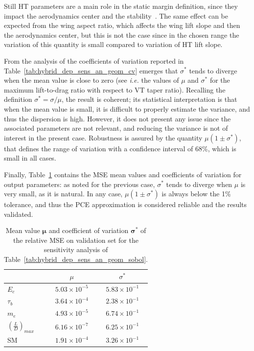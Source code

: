 Still HT parameters are a main role in the static margin definition, since they impact the aerodynamics center and the stability~\cite{bib:anderson_perfo}. 
The same effect can be expected from the wing aspect ratio, which affects the wing lift slope and then the aerodynamics center, but this is not the case since in the chosen range the variation of this quantity is small compared to variation of HT lift slope.

From the analysis of the coefficients of variation reported in Table~\ref{tab:hybrid_dep_sens_an_geom_cv} emerges that $\sigma^*$ tends to diverge when the mean value is close to zero (see \textit{i.e.} the values of $\mu$ and $\sigma^*$ for the maximum lift-to-drag ratio with respect to VT taper ratio).
Recalling the definition $\sigma^*=\sigma/\mu$, the result is coherent; its statistical interpretation is that when the mean value is small, it is difficult to properly estimate the variance, and thus the dispersion is high.
However, it does not present any issue since the associated parameters are not relevant, and reducing the variance is not of interest in the present case.
Robustness is assured by the quantity $\mu\left(1\pm\sigma^*\right)$, that defines the range of variation with a confidence interval of 68\%, which is small in all cases.

Finally, Table~\ref{tab:hybrid_dep_sensitivity_analysis_mse} contains the MSE mean values and coefficients of variation for output parameters: as noted for the previous case, $\sigma^*$ tends to diverge when $\mu$ is very small, as it is natural.
In any case, $\mu\left(1\pm\sigma^*\right)$ is always below the 1\% tolerance, and thus the PCE approximation is considered reliable and the results validated.
\begin{table}[!h]
	\centering
	\begin{tabular}{l c c}
		\hline
		& $\mu$ & $\sigma^*$ \\
		\hline
		$E_{c}$ & $5.03\times10^{-5}$ & $5.83\times10^{-1}$ \\
		$\tau_{b}$ & $3.64\times10^{-4}$ & $2.38\times10^{-1}$ \\
		$m_e$ & $4.93\times10^{-5}$ & $6.74\times10^{-1}$ \\
		$\left(\frac{L}{D}\right)_{max}$ & $6.16\times10^{-7}$ & $6.25\times10^{-1}$ \\
		SM & $1.91\times10^{-4}$ & $3.26\times10^{-1}$ \\
		\hline
	\end{tabular}
	\caption{Mean value $\mathbf{\mu}$ and coefficient of variation $\mathbf{\sigma^*}$ of the relative MSE on validation set for the sensitivity analysis of Table~\ref{tab:hybrid_dep_sens_an_geom_sobol}.}
	\label{tab:hybrid_dep_sensitivity_analysis_mse}
\end{table}

